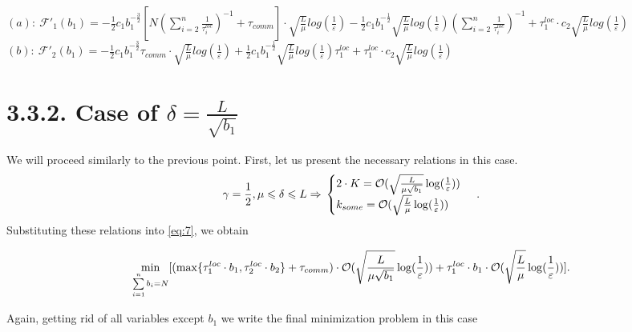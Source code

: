 \documentclass{article}
\theoremstyle{definition}
\theoremstyle{plain}
\begin{document}
$(a): ~\mathcal{F'}_1(b_1) = -\frac{1}{2}c_1 b_1^{-\frac{3}{2}}  [N (\sum\limits_{i = 2}^{n} \frac{1}{\tau_i^{loc}})^{-1} + \tau_{comm}]\cdot 
\sqrt{\frac{L}{\mu}}log (\frac{1}{\varepsilon})  - 
\frac{1}{2} c_1 b_1^{-\frac{1}{2}}   \sqrt{\frac{L}{\mu}}log (\frac{1}{\varepsilon})(\sum\limits_{i = 2}^{n} \frac{1}{\tau_i^{loc}})^{-1} +
\tau_1^{loc}\cdot c_2  \sqrt{\frac{L}{\mu}}log (\frac{1}{\varepsilon})$ \\
$(b): ~\mathcal{F'}_2(b_1) = -\frac{1}{2}c_1 b_1^{-\frac{3}{2}} \tau_{comm}\cdot \sqrt{\frac{L}{\mu}}log (\frac{1}{\varepsilon}) + \frac{1}{2} c_1 b_1^{-\frac{1}{2}}  \sqrt{\frac{L}{\mu}}log (\frac{1}{\varepsilon})\tau_1^{loc}   + \tau_1^{loc}\cdot c_2  \sqrt{\frac{L}{\mu}}log (\frac{1}{\varepsilon})$\\


\section*{3.3.2. Case of $\delta = \frac{L}{\sqrt{b_1}}$}
We will proceed similarly to the previous point. First, let us present the necessary relations in this case.
\begin{equation}
    \notag
    \gamma = \frac{1}{2}, \mu \leq \delta \leq L \Rightarrow 
    \\
    \notag
    \begin{cases}
      2\cdot K = \mathcal O(\sqrt{\frac{L}{\mu \sqrt{b_1}}}\log(\frac{1}{\varepsilon}))\\
      k_{some} = \mathcal O(\sqrt{\frac{L}{\mu}}\log(\frac{1}{\varepsilon}))
    \end{cases}\,.
\end{equation}
Substituting these relations into \eqref{eq:7}, we obtain

\begin{equation}
    \notag
    \underset{\sum\limits_{i = 1}^{n} b_i = N}{\min}[(\max\{\tau_1^{loc}\cdot b_1, \tau_2^{loc}\cdot b_2\} + \tau_{comm}) \cdot \mathcal O(\sqrt{\frac{L}{\mu \sqrt{b_1}}}\log(\frac{1}{\varepsilon})) + \tau_1^{loc}\cdot b_1 \cdot \mathcal O(\sqrt{\frac{L}{\mu}}\log(\frac{1}{\varepsilon}))].
\end{equation}

Again, getting rid of all variables except $b_1$ we write the final minimization problem in this case
\end{document}

